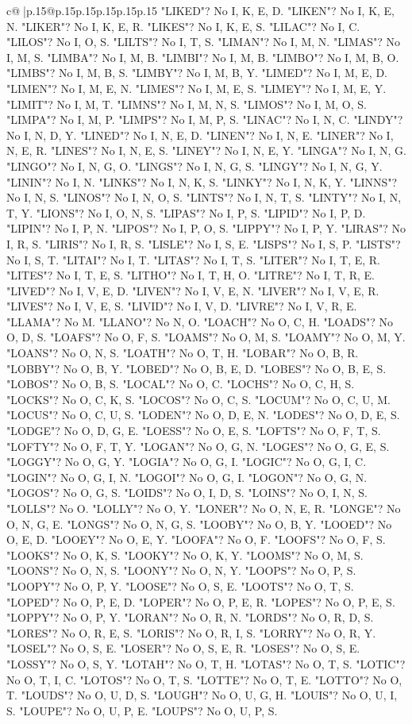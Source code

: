 \documentclass{article}
\begin{document}
{\begin{supertabular}{c@{$\;$}|p{.15\linewidth}@{}p{.15\linewidth}p{.15\linewidth}p{.15\linewidth}p{.15\linewidth}p{.15\linewidth}}
{{{"LIKED"? No I, K, E, D. "LIKEN"? No I, K, E, N. "LIKER"? No I, K, E, R. "LIKES"? No I, K, E, S. "LILAC"? No I, C. "LILOS"? No I, O, S. "LILTS"? No I, T, S. "LIMAN"? No I, M, N. "LIMAS"? No I, M, S. "LIMBA"? No I, M, B. "LIMBI"? No I, M, B. "LIMBO"? No I, M, B, O. "LIMBS"? No I, M, B, S. "LIMBY"? No I, M, B, Y. "LIMED"? No I, M, E, D. "LIMEN"? No I, M, E, N. "LIMES"? No I, M, E, S. "LIMEY"? No I, M, E, Y. "LIMIT"? No I, M, T. "LIMNS"? No I, M, N, S. "LIMOS"? No I, M, O, S. "LIMPA"? No I, M, P. "LIMPS"? No I, M, P, S. "LINAC"? No I, N, C. "LINDY"? No I, N, D, Y. "LINED"? No I, N, E, D. "LINEN"? No I, N, E. "LINER"? No I, N, E, R. "LINES"? No I, N, E, S. "LINEY"? No I, N, E, Y. "LINGA"? No I, N, G. "LINGO"? No I, N, G, O. "LINGS"? No I, N, G, S. "LINGY"? No I, N, G, Y. "LININ"? No I, N. "LINKS"? No I, N, K, S. "LINKY"? No I, N, K, Y. "LINNS"? No I, N, S. "LINOS"? No I, N, O, S. "LINTS"? No I, N, T, S. "LINTY"? No I, N, T, Y. "LIONS"? No I, O, N, S. "LIPAS"? No I, P, S. "LIPID"? No I, P, D. "LIPIN"? No I, P, N. "LIPOS"? No I, P, O, S. "LIPPY"? No I, P, Y. "LIRAS"? No I, R, S. "LIRIS"? No I, R, S. "LISLE"? No I, S, E. "LISPS"? No I, S, P. "LISTS"? No I, S, T. "LITAI"? No I, T. "LITAS"? No I, T, S. "LITER"? No I, T, E, R. "LITES"? No I, T, E, S. "LITHO"? No I, T, H, O. "LITRE"? No I, T, R, E. "LIVED"? No I, V, E, D. "LIVEN"? No I, V, E, N. "LIVER"? No I, V, E, R. "LIVES"? No I, V, E, S. "LIVID"? No I, V, D. "LIVRE"? No I, V, R, E. "LLAMA"? No M. "LLANO"? No N, O. "LOACH"? No O, C, H. "LOADS"? No O, D, S. "LOAFS"? No O, F, S. "LOAMS"? No O, M, S. "LOAMY"? No O, M, Y. "LOANS"? No O, N, S. "LOATH"? No O, T, H. "LOBAR"? No O, B, R. "LOBBY"? No O, B, Y. "LOBED"? No O, B, E, D. "LOBES"? No O, B, E, S. "LOBOS"? No O, B, S. "LOCAL"? No O, C. "LOCHS"? No O, C, H, S. "LOCKS"? No O, C, K, S. "LOCOS"? No O, C, S. "LOCUM"? No O, C, U, M. "LOCUS"? No O, C, U, S. "LODEN"? No O, D, E, N. "LODES"? No O, D, E, S. "LODGE"? No O, D, G, E. "LOESS"? No O, E, S. "LOFTS"? No O, F, T, S. "LOFTY"? No O, F, T, Y. "LOGAN"? No O, G, N. "LOGES"? No O, G, E, S. "LOGGY"? No O, G, Y. "LOGIA"? No O, G, I. "LOGIC"? No O, G, I, C. "LOGIN"? No O, G, I, N. "LOGOI"? No O, G, I. "LOGON"? No O, G, N. "LOGOS"? No O, G, S. "LOIDS"? No O, I, D, S. "LOINS"? No O, I, N, S. "LOLLS"? No O. "LOLLY"? No O, Y. "LONER"? No O, N, E, R. "LONGE"? No O, N, G, E. "LONGS"? No O, N, G, S. "LOOBY"? No O, B, Y. "LOOED"? No O, E, D. "LOOEY"? No O, E, Y. "LOOFA"? No O, F. "LOOFS"? No O, F, S. "LOOKS"? No O, K, S. "LOOKY"? No O, K, Y. "LOOMS"? No O, M, S. "LOONS"? No O, N, S. "LOONY"? No O, N, Y. "LOOPS"? No O, P, S. "LOOPY"? No O, P, Y. "LOOSE"? No O, S, E. "LOOTS"? No O, T, S. "LOPED"? No O, P, E, D. "LOPER"? No O, P, E, R. "LOPES"? No O, P, E, S. "LOPPY"? No O, P, Y. "LORAN"? No O, R, N. "LORDS"? No O, R, D, S. "LORES"? No O, R, E, S. "LORIS"? No O, R, I, S. "LORRY"? No O, R, Y. "LOSEL"? No O, S, E. "LOSER"? No O, S, E, R. "LOSES"? No O, S, E. "LOSSY"? No O, S, Y. "LOTAH"? No O, T, H. "LOTAS"? No O, T, S. "LOTIC"? No O, T, I, C. "LOTOS"? No O, T, S. "LOTTE"? No O, T, E. "LOTTO"? No O, T. "LOUDS"? No O, U, D, S. "LOUGH"? No O, U, G, H. "LOUIS"? No O, U, I, S. "LOUPE"? No O, U, P, E. "LOUPS"? No O, U, P, S. }}}
\end{supertabular}}
\end{document}
